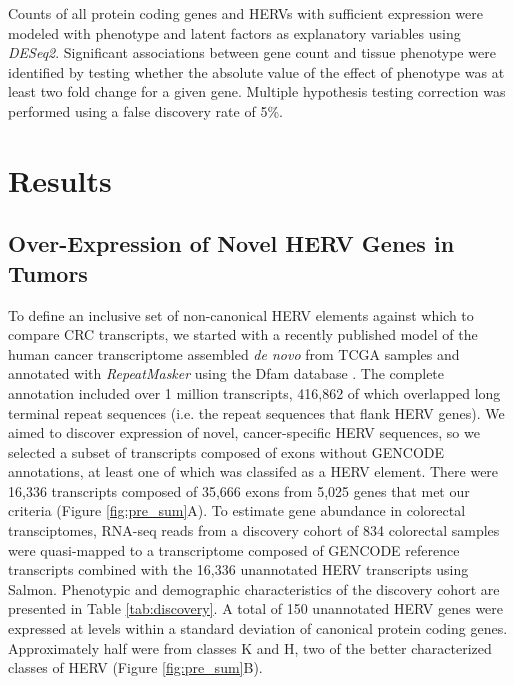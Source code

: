 \documentclass[11pt,letterpaper]{article}
\begin{document}
Counts of all protein coding genes and HERVs with sufficient expression were modeled with phenotype and latent factors as explanatory variables using \emph{DESeq2}.
Significant associations between gene count and tissue phenotype were identified by testing whether the absolute value of the effect of phenotype was at least two fold change for a given gene.
Multiple hypothesis testing correction was performed using a false discovery rate of 5\%.

\section*{Results}
\subsection*{Over-Expression of Novel HERV Genes in Tumors}
To define an inclusive set of non-canonical HERV elements against which to compare CRC transcripts, we started with a recently published model of the human cancer transcriptome assembled \emph{de novo} from TCGA samples and annotated with \emph{RepeatMasker} using the Dfam database \citep{Attig2019}.
The complete annotation included over 1 million transcripts, 416,862 of which overlapped long terminal repeat sequences (i.e. the repeat sequences that flank HERV genes).
We aimed to discover expression of novel, cancer-specific HERV sequences, so we selected a subset of transcripts composed of exons without GENCODE annotations, at least one of which was classifed as a HERV element.
There were 16,336 transcripts composed of 35,666 exons from 5,025 genes that met our criteria (Figure \ref{fig:pre_sum}A).
To estimate gene abundance in colorectal transciptomes, RNA-seq reads from a discovery cohort of 834 colorectal samples were quasi-mapped to a transcriptome composed of GENCODE reference transcripts combined with the 16,336 unannotated HERV transcripts using Salmon.
Phenotypic and demographic characteristics of the discovery cohort are presented in Table \ref{tab:discovery}.
A total of 150 unannotated HERV genes were expressed at levels within a standard deviation of canonical protein coding genes.
Approximately half were from classes K and H, two of the better characterized classes of HERV (Figure \ref{fig:pre_sum}B).
\end{document}
